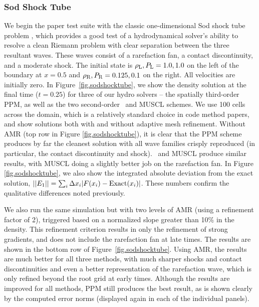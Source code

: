 \subsubsection{Sod Shock Tube}
\label{sec.tests.sodshock}

We begin the paper test suite with the classic one-dimensional Sod
shock tube problem \citep{Sod78}, which provides a good test of a
hydrodynamical solver's ability to resolve a clean Riemann problem
with clear separation between the three resultant waves.  These waves
consist of a rarefaction fan, a contact discontinuity, and a moderate
shock.  The initial state is $\rho_{\rm L}, P_{\rm L} = 1.0, 1.0$ on
the left of the boundary at $x=0.5$ and $\rho_{\rm R}, P_{\rm R} =
0.125, 0.1$ on the right.  All velocities are initially zero.  In
Figure~\ref{fig.sodshocktube}, we show the density solution at the
final time ($t=0.25$) for three of our hydro solvers -- the spatially
third-order PPM, as well as the two second-order \zeus\ and MUSCL
schemes.  We use 100 cells across the domain, which is a relatively
standard choice in code method papers, and show solutions both with
and without adaptive mesh refinement.  Without AMR (top row in Figure
\ref{fig.sodshocktube}), it is clear that the PPM scheme produces by
far the cleanest solution with all wave families crisply reproduced
(in particular, the contact discontinuity and shock).  \zeus\ and
MUSCL produce similar results, with MUSCL doing a slightly better job
on the rarefaction fan.  In Figure \ref{fig.sodshocktube}, we also
show the integrated absolute deviation from the exact solution,
$||E_1|| = \sum_i \Delta x_i |F(x_i)-{\rm Exact}(x_i)|$.  These
numbers confirm the qualitative differences noted previously.

We also run the same simulation but with two levels of AMR (using a
refinement factor of 2), triggered based on a normalized slope greater
than 10\% in the density.  This refinement criterion results in only
the refinement of strong gradients, and does not include the
rarefaction fan at late times.  The results are shown in the bottom
row of Figure~\ref{fig.sodshocktube}.  Using AMR, the results are much
better for all three methods, with much sharper shocks and contact
discontinuities and even a better representation of the rarefaction
wave, which is only refined beyond the root grid at early times.
Although the results are improved for all methods, PPM still produces
the best result, as is shown clearly by the computed error norms
(displayed again in each of the individual panels).


